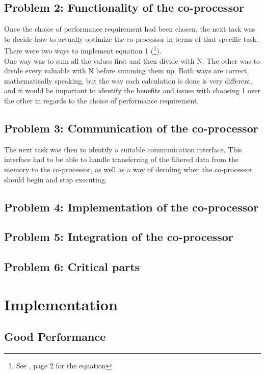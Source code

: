 \documentclass[12pt,a4paper]{article}
\begin{document}
	
\subsection{Problem 2: Functionality of the co-processor}
	Once the choice of performance requirement had been chosen, the next task was to decide how to actually optimize the co-processor in terms of that specific task. There were two ways to implement equation 1 (\footnote{See 	\cite{A3}, page 2 for the equation}).\\
	One way was to sum all the values first and then divide with N. The other was to divide every valuable with N before summing them up. Both ways are correct, mathematically speaking, but the way each calculation is done is very different, and it would be important to identify the benefits and issues with choosing 1 over the other in regards to the choice of performance requirement.\\
	
\subsection{Problem 3: Communication of the co-processor}
	The next task was then to identify a suitable communication interface. This interface had to be able to handle transferring of the filtered data from the memory to the co-processor, as well as a way of deciding when the co-processor should begin and stop executing.

\subsection{Problem 4: Implementation of the co-processor}

\subsection{Problem 5: Integration of the co-processor}
	
\subsection{Problem 6: Critical parts}
		
\section{Implementation}
\subsection{Good Performance}
\end{document}
